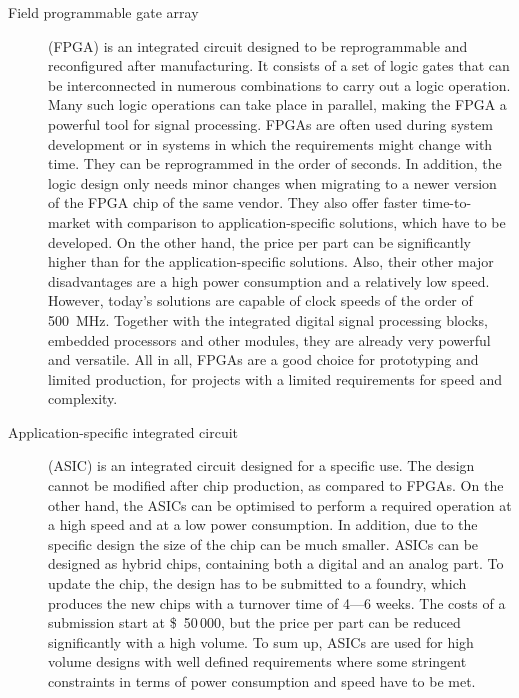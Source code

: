 \begin{description}
\item[Field programmable gate array] (FPGA) is an integrated circuit designed to be reprogrammable and reconfigured after manufacturing. It consists of a set of logic gates that can be interconnected in numerous combinations to carry out a logic operation. Many such logic operations can take place in parallel, making the FPGA a powerful tool for signal processing. FPGAs are often used during system development or in systems in which the requirements might change with time. They can be reprogrammed in the order of seconds. In addition, the logic design only needs minor changes when migrating to a newer version of the FPGA chip of the same vendor. They also offer faster time-to-market with comparison to application-specific solutions, which have to be developed. On the other hand, the price per part can be significantly higher than for the application-specific solutions. Also, their other major disadvantages are a high power consumption and a relatively low speed. However, today's solutions are capable of clock speeds of the order of 500~MHz. Together with the integrated digital signal processing blocks, embedded processors and other modules, they are already very powerful and versatile. All in all, FPGAs are a good choice for prototyping and limited production, for projects with a limited requirements for speed and complexity.

\item[Application-specific integrated circuit] (ASIC) is an integrated circuit designed for a specific use. The design cannot be modified after chip production, as compared to FPGAs. On the other hand, the ASICs can be optimised to perform a required operation at a high speed and at a low power consumption. In addition, due to the specific design the size of the chip can be much smaller. ASICs can be designed as hybrid chips, containing both a digital and an analog part.  
To update the chip, the design has to be submitted to a foundry, which produces the new chips with a turnover time of 4---6 weeks. The costs of a submission start at \$~50\,000, but the price per part can be reduced significantly with a high volume. To sum up, ASICs are used for high volume designs with well defined requirements where some stringent constraints in terms of power consumption and speed have to be met.
\end{description} 

